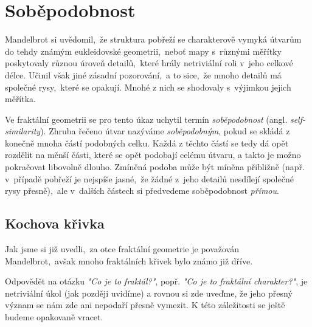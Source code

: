 \section{Soběpodobnost}\label{sec:sobepodobnost}
Mandelbrot si uvědomil,~že struktura pobřeží se charakterově vymyká útvarům do tehdy známým eukleidovské geometrii,~neboť mapy s~různými měřítky poskytovaly různou úroveň detailů,~které hrály netriviální roli v~jeho celkové délce. Učinil však jiné zásadní pozorování,~a to sice,~že mnoho detailů má společné rysy,~které se opakují. Mnohé z nich se shodovaly s~výjimkou jejich měřítka. \citep[str. 96]{Mandelbrot1983}\par

Ve fraktální geometrii se pro tento úkaz uchytil termín \emph{soběpodobnost} (angl. \emph{self-similarity}). Zhruba řečeno útvar nazýváme \emph{soběpodobným}, pokud se skládá z konečně mnoha částí podobných celku. Každá z těchto částí se tedy dá opět rozdělit na měnší části, které se opět podobají celému útvaru, a takto je možno pokračovat libovolně dlouho. Zmíněná podoba může být míněna přibližně (např. v~případě pobřeží je nejspíše jasné,~že žádné z~jeho detailů nesdílejí společné rysy přesně),~ale v~dalších částech si předvedeme soběpodobnost \emph{přímou}.

\subsection{Kochova křivka}\label{subsec:kochova_krivka}
Jak jsme si již uvedli,~za otce fraktální geometrie je považován Mandelbrot,~avšak mnoho fraktálních křivek bylo známo již dříve.

Odpovědět na otázku \emph{"Co je to fraktál?"}, popř. \emph{"Co je to fraktální charakter?"}, je netriviální úkol (jak později uvidíme) a rovnou si zde uveďme, že jeho přesný význam se nám zde ani nepodaří přesně vymezit. K této záležitosti se ještě budeme opakovaně vracet.

